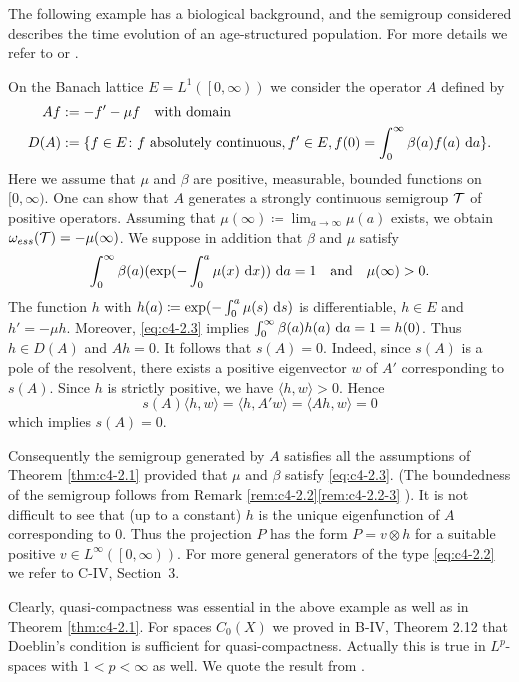 The following example has a biological background, and the semigroup considered describes the time evolution of an age-structured population.
For more details we refer to \citet{greiner:1984a} or \citet{webb:1984}.

\begin{example}\label{ex:c4-2.3}
%
%
%
On the Banach lattice $E = L^{1}( \left[0,\infty\right))$ we consider the operator $A$ defined by
\begin{align}\label{eq:c4-2.2}
Af &:= -f' - \mu f \quad \text{with domain}\\ \notag
D(A) &:= \{f \in E \colon f \text{ absolutely continuous}, f' \in E, f(0) = \int_{0}^{\infty} \beta(a)f(a) \, \mathop{}\!\mathrm{d}{a} \}.
\end{align}
Here we assume that $\mu$ and $\beta$ are positive, measurable, bounded functions on $[0,\infty)$.
One can show that $A$ generates a strongly continuous semigroup $\mathcal{T}$ of positive operators.
Assuming that $\mu(\infty) \coloneqq \lim_{a \to \infty}\mu(a)$ exists, we obtain $\omega_{ess}(\mathcal{T}) = -\mu(\infty)$.
We suppose in addition that $\beta$ and $\mu$ satisfy
\begin{equation}\label{eq:c4-2.3}
\int_{0}^{\infty} \beta(a)(\exp(-\int_{0}^{a} \mu(x) \, \mathop{}\!\mathrm{d}{x}))\, \mathop{}\!\mathrm{d}{a} = 1 \quad \text{and} \quad \mu(\infty) > 0.
\end{equation}
The function $h$ with $h(a) \coloneqq \exp(-\int_{0}^{a} \mu(s) \, \mathop{}\!\mathrm{d}{s})$ is differentiable, $h \in E$ and $h' = -\mu h$.
Moreover, \ref{eq:c4-2.3} implies $\int_{0}^{\infty} \beta(a)h(a) \, \mathop{}\!\mathrm{d}{a} = 1 = h(0)$.
Thus $h \in D(A)$ and $Ah = 0$.
It follows that $s(A) = 0$.
Indeed, since $s(A)$ is a pole of the resolvent, there exists a positive eigenvector $w$ of $A'$ corresponding to $s(A)$.
Since $h$ is strictly positive, we have $\langle h,w \rangle > 0$. 
Hence 
\[
s(A)\langle h,w \rangle = \langle h,A'w \rangle = \langle Ah,w \rangle = 0
\]
which implies $s(A) = 0$.

Consequently the semigroup generated by $A$ satisfies all the assumptions of Theorem \ref{thm:c4-2.1} provided that $\mu$ and $\beta$ satisfy \eqref{eq:c4-2.3}.
(The boundedness of the semigroup follows from Remark \ref{rem:c4-2.2}\ref{rem:c4-2.2-3} ).
It is not difficult to see that (up to a constant) $h$ is the unique eigenfunction of $A$ corresponding to $0$.
Thus the projection $P$ has the form $P = v \otimes h$ for a suitable positive $v \in L^{\infty}( \left[0,\infty\right))$.
For more general generators of the type \eqref{eq:c4-2.2} we refer to C-IV, Section~3.
\end{example}
Clearly, quasi-compactness was essential in the above example as well as in Theorem \ref{thm:c4-2.1}.
For spaces $C_{0}(X)$ we proved in B-IV, Theorem 2.12 that Doeblin's condition is sufficient for quasi-compactness.
Actually this is true in $L^{p}$-spaces with $1 < p < \infty$ as well.
We quote the result from \citet{lotz:1986}.

